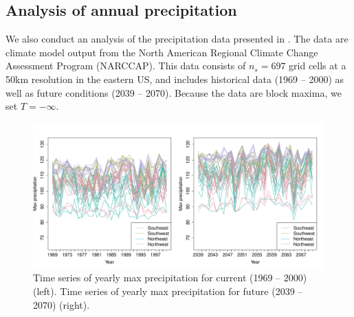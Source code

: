 \documentclass[aoas]{imsart}
\begin{document}
\subsection{Analysis of annual precipitation}\label{ebs:precip}

We also conduct an analysis of the precipitation data presented in \citet{Reich2012}.
The data are climate model output from the North American Regional Climate Change Assessment Program (NARCCAP).
This data consists of $n_s = 697$ grid cells at a 50km resolution in the eastern US, and includes historical data (1969 -- 2000) as well as future conditions (2039 -- 2070).
Because the data are block maxima, we set $T = -\infty$.

\begin{figure}[htbp]  %
  \centering
  \includegraphics[width=\linewidth]{plots/precip-ts}
  \caption{Time series of yearly max precipitation for current (1969 -- 2000) (left). Time series of yearly max precipitation for future (2039 -- 2070) (right).}
  \label{ebfig:tsprecip}
\end{figure}
\end{document}
